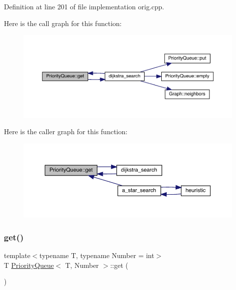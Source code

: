 Definition at line 201 of file implementation orig.\+cpp.

Here is the call graph for this function\+:
\nopagebreak
\begin{figure}[H]
\begin{center}
\leavevmode
\includegraphics[width=350pt]{struct_priority_queue_ab211c9583fda5c1a6352021444af5f0e_cgraph}
\end{center}
\end{figure}
Here is the caller graph for this function\+:\nopagebreak
\begin{figure}[H]
\begin{center}
\leavevmode
\includegraphics[width=350pt]{struct_priority_queue_ab211c9583fda5c1a6352021444af5f0e_icgraph}
\end{center}
\end{figure}
\mbox{\label{struct_priority_queue_ab211c9583fda5c1a6352021444af5f0e}} 
\subsubsection{\texorpdfstring{get()}{get()}\hspace{0.1cm}{\footnotesize\ttfamily [2/2]}}
{\footnotesize\ttfamily template$<$typename T, typename Number = int$>$ \\
T \hyperlink{struct_priority_queue}{Priority\+Queue}$<$ T, Number $>$\+::get (\begin{DoxyParamCaption}{ }\end{DoxyParamCaption})\hspace{0.3cm}{\ttfamily [inline]}}



